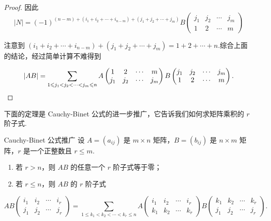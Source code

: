 \begin{proof}
    因此
    \[ |N| = (-1)^{(n-m) + (i_1 + i_2 + \cdots + i_{n-m}) + (j_1 + j_2 + \cdots + j_m)} B
    \begin{pmatrix}
        j_1 & j_2 & \cdots & j_m \\
        1 & 2 & \cdots & m
    \end{pmatrix}
    \]

    注意到 $ (i_1 + i_2 + \cdots + i_{n-m}) + (j_1 + j_2 + \cdots + j_m) = 1 + 2 + \cdots + n $.综合上面的结论，经过简单计算不难得到

    \[ |AB| = \sum_{1 \leqslant j_1 < j_2 < \cdots < j_m \leqslant n} A
    \begin{pmatrix}
        1 & 2 & \cdots & m \\
        j_1 & j_2 & \cdots & j_m
    \end{pmatrix}
    B
    \begin{pmatrix}
        j_1 & j_2 & \cdots & j_m \\
        1 & 2 & \cdots & m
    \end{pmatrix}. \qedhere
    \]
\end{proof}

下面的定理是 Cauchy-Binet 公式的进一步推广，它告诉我们如何求矩阵乘积的 $r$ 阶子式.

\begin{theorem}{}{Cauchy-Binet 公式推广}
    设 $A = (a_{ij})$ 是 $m \times n$ 矩阵，$B = (b_{ij})$ 是 $n \times m$ 矩阵，$r$ 是一个正整数且 $r \leqslant m$.
    \begin{enumerate}
        \item 若 $r > n$，则 $AB$ 的任意一个 $r$ 阶子式等于零；
        \item 若 $r \leqslant n$，则 $AB$ 的 $r$ 阶子式
    \end{enumerate}
    \[
        AB
        \begin{pmatrix}
            i_1 & i_2 & \cdots & i_r \\
            j_1 & j_2 & \cdots & j_r
        \end{pmatrix}
        = \sum_{1 \leqslant k_1 < k_2 < \cdots < k_r \leqslant n} A
        \begin{pmatrix}
            i_1 & i_2 & \cdots & i_r \\
            k_1 & k_2 & \cdots & k_r
        \end{pmatrix}
        B
        \begin{pmatrix}
            k_1 & k_2 & \cdots & k_r \\
            j_1 & j_2 & \cdots & j_r
        \end{pmatrix}.
    \]
\end{theorem}

